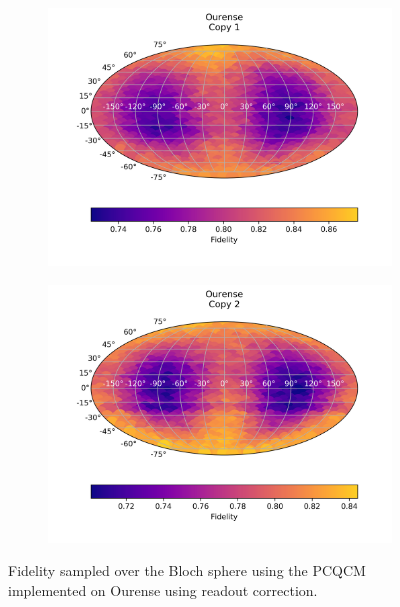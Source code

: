 \begin{figure}[H]
  \centering
  \begin{subfigure}{.5\textwidth}
    \centering
    \includegraphics[width=\textwidth]{Figures/PhaseCovariant/IBM/FullSphere/results_corrected_ourense_copy1.png}
    
    \label{fig:pc_corrected_ourense_sphere_1}
  \end{subfigure}%
  \begin{subfigure}{.5\textwidth}
    \centering
    \includegraphics[width=\textwidth]{Figures/PhaseCovariant/IBM/FullSphere/results_corrected_ourense_copy2.png}
    
    \label{fig:pc_corrected_ourense_sphere_2}
  \end{subfigure}
  \caption{Fidelity sampled over the Bloch sphere using the PCQCM implemented on Ourense using readout correction.}
  \label{fig:pc_corrected_ourense_sphere}
\end{figure}

